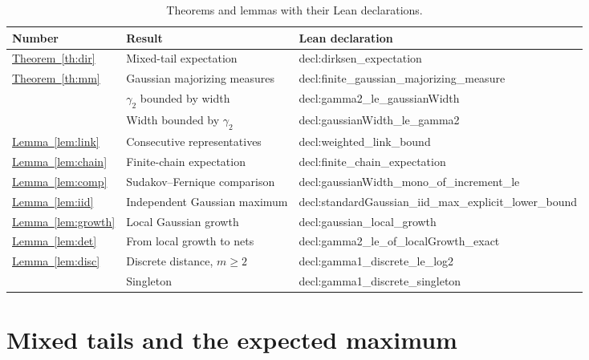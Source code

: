 \documentclass[11pt,letterpaper,twoside,leqno]{article}
\theoremstyle{bookplain}
\newcommand{\nm}[1]{\texttt{\detokenize{#1}}}
\DeclareRobustCommand{\decllink}[2]{\csname decl:#1\endcsname{#2}}
\newcommand{\declname}[1]{\decllink{#1}{\nm{#1}}}
\begin{document}
\begin{table}[!ht]
\centering
\caption{Theorems and lemmas with their Lean declarations.}\label{tab:lean}
\smallskip
\small
\renewcommand{\arraystretch}{1.18}
\begin{tabular}{@{}l@{\enspace}l@{\enspace}l@{}}
\toprule
Number & Result & Lean declaration \\
\midrule
\hyperref[th:dir]{Theorem~\ref*{th:dir}} & Mixed-tail expectation & \declname{dirksen_expectation} \\
\addlinespace[3pt]
\hyperref[th:mm]{Theorem~\ref*{th:mm}} & Gaussian majorizing measures & \declname{finite_gaussian_majorizing_measure} \\
 & $\gamma_2$ bounded by width & \declname{gamma2_le_gaussianWidth} \\
 & Width bounded by $\gamma_2$ & \declname{gaussianWidth_le_gamma2} \\
\addlinespace[3pt]
\hyperref[lem:link]{Lemma~\ref*{lem:link}} & Consecutive representatives & \declname{weighted_link_bound} \\
\hyperref[lem:chain]{Lemma~\ref*{lem:chain}} & Finite-chain expectation & \declname{finite_chain_expectation} \\
\hyperref[lem:comp]{Lemma~\ref*{lem:comp}} & Sudakov--Fernique comparison & \declname{gaussianWidth_mono_of_increment_le} \\
\hyperref[lem:iid]{Lemma~\ref*{lem:iid}} & Independent Gaussian maximum & \declname{standardGaussian_iid_max_explicit_lower_bound} \\
\hyperref[lem:growth]{Lemma~\ref*{lem:growth}} & Local Gaussian growth & \declname{gaussian_local_growth} \\
\hyperref[lem:det]{Lemma~\ref*{lem:det}} & From local growth to nets & \declname{gamma2_le_of_localGrowth_exact} \\
\hyperref[lem:disc]{Lemma~\ref*{lem:disc}} & Discrete distance, $m\ge2$ & \declname{gamma1_discrete_le_log2} \\
 & Singleton & \declname{gamma1_discrete_singleton} \\
\bottomrule
\end{tabular}
\end{table}

\clearpage
\section{Mixed tails and the expected maximum}
\end{document}

